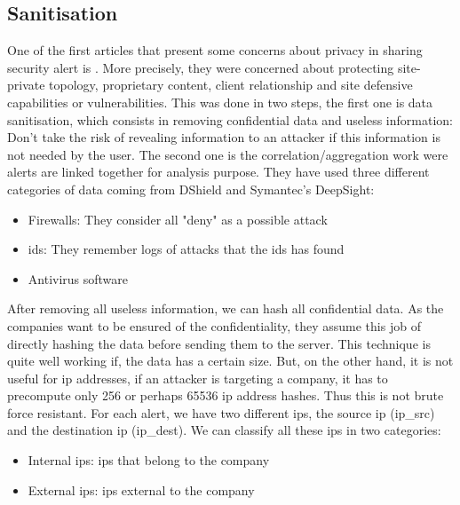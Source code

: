 \documentclass{eplmastersthesis}
\begin{document}
\subsection{Sanitisation}
One of the first articles that present some concerns about privacy in sharing security alert is \cite{lincoln2004privacy}.
More precisely, they were concerned about protecting site-private topology, proprietary content, client relationship and site defensive capabilities or vulnerabilities.
This was done in two steps, the first one is data sanitisation, which consists in removing confidential data and useless information: Don't take the risk of revealing information to an attacker if this information is not needed by the user.
The second one is the correlation/aggregation work were alerts are linked together for analysis purpose.
 They have used three different categories of data coming from DShield and Symantec's DeepSight:
\begin{itemize}
\item Firewalls: They consider all "deny" as a possible attack
\item \gls{ids}: They remember logs of attacks that the \gls{ids} has found
\item Antivirus software
\end{itemize}

After removing all useless information, we can hash all confidential data. As the companies want to be ensured of the confidentiality, they assume this job of directly hashing the data before sending them to the server.
This technique is quite well working if, the data has a certain size. But, on the other hand, it is not useful for \gls{ip} addresses, if an attacker is targeting a company, it has to precompute only 256 or perhaps 65536 \gls{ip} address hashes. Thus this is not brute force resistant.
For each alert, we have two different \glspl{ip}, the source \gls{ip} (ip\_src) and the destination \gls{ip} (ip\_dest). We can classify all these \glspl{ip} in two categories:
\begin{itemize}
	\item Internal \glspl{ip}: \glspl{ip} that belong to the company
	\item External \glspl{ip}: \glspl{ip} external to the company
\end{itemize}
\end{document}
